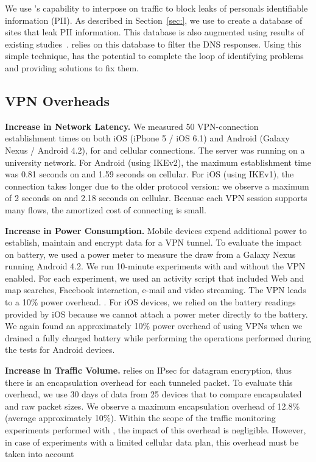 We use \meddle's capability to interpose on traffic to block leaks of personals identifiable information (PII).
As described in Section~\ref{sec:}, we use \meddle to create a database of sites that leak PII information. 
This database is also augmented using results of existing studies~\cite{vallina-rodriguez:bfc, hornyack:appfence,pathak:eprof}.
\meddle relies on this database to filter the DNS responses. 
Using this simple technique, \meddle has the potential to complete the loop of identifying problems and providing solutions to fix them. 

\subsection{VPN Overheads}

\noindent\textbf{Increase in Network Latency.}
We measured 50 VPN-connection establishment times  on both iOS (iPhone 5 / iOS 6.1) and Android (Galaxy Nexus /
Android 4.2), for \wifi{} and cellular connections. 
The \meddle server was running on a university network. 
For Android (using IKEv2), the maximum establishment time was 0.81 seconds on \wifi{} and 1.59 seconds on cellular. 
For iOS (using IKEv1), the connection takes longer due to the older protocol version: we observe a maximum of 2 seconds on \wifi{} and 2.18 seconds on cellular. 
Because each VPN session supports many flows, the amortized cost of connecting is  small. 

\noindent\textbf{Increase in Power Consumption.}
Mobile devices expend additional power to establish, maintain and encrypt data for a VPN tunnel. 
To evaluate the impact on battery, we used a power meter to measure the draw from a Galaxy Nexus running Android 4.2. 
We run 10-minute experiments with and without the VPN enabled. 
For each experiment, we used an activity script that included Web and map searches, Facebook interaction, e-mail and video
streaming. 
The VPN leads to a 10\% power overhead. . 
For iOS devices, we relied on the battery readings provided by iOS because we cannot attach a power meter directly to the battery.
We again found an approximately 10\% power overhead of using VPNs when we drained a fully charged battery while performing the operations performed during the tests for Android devices.  

\noindent\textbf{Increase in Traffic Volume.}
\meddle relies on IPsec for datagram encryption, thus there is an encapsulation overhead for each tunneled packet. 
To evaluate this overhead, we use 30 days of data from 25 devices that to compare encapsulated and raw packet sizes. 
We observe a maximum encapsulation overhead of 12.8\% (average approximately 10\%). 
Within the scope of the traffic monitoring experiments performed with \meddle, the impact of this overhead is negligible. 
However, in case of experiments with a limited cellular data plan, this overhead must be taken into account

